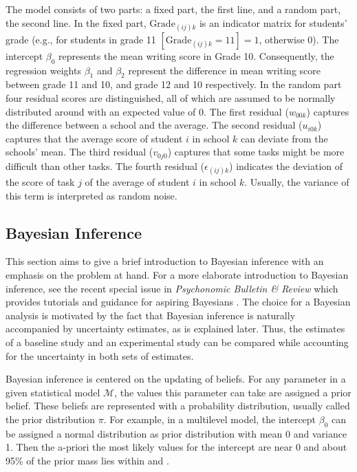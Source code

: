 \documentclass[a4paper]{article}
\newcommand{\model}{\mathcal{M}}
\begin{document}
The model consists of two parts: a fixed part, the first line, and a random part, the second line. In the fixed part, $\mathrm{Grade}_{(ij)k}$ is an indicator matrix for students' grade (e.g., for students in grade 11 $[\mathrm{Grade}_{(ij)k}=11] = 1$, otherwise 0). The intercept $\beta_0$ represents the mean writing score in Grade 10. Consequently, the regression weights $\beta_1$ and $\beta_2$ represent the difference in mean writing score between grade 11 and 10, and grade 12 and 10 respectively. In the random part four residual scores are distinguished, all of which are assumed to be normally distributed around with an expected value of 0. The first residual ($w_{00k}$) captures the difference between a school and the average. The second residual ($u_{i0k}$) captures that the average score of student $i$ in school $k$ can deviate from the schools' mean. The third residual ($v_{0j0}$) captures that some tasks might be more difficult than other tasks. The fourth residual ($\epsilon_{(ij)k}$) indicates the deviation of the score of task $j$ of the average of student $i$ in school $k$. Usually, the variance of this term is interpreted as random noise.


\subsection*{Bayesian Inference}

This section aims to give a brief introduction to Bayesian inference with an emphasis on the problem at hand. For a more elaborate introduction to Bayesian inference, see the recent special issue in \emph{Psychonomic Bulletin \& Review} which provides tutorials and guidance for aspiring Bayesians \cite{VandekerckhoveEtAl2018SI}. The choice for a Bayesian analysis is motivated by the fact that Bayesian inference is naturally accompanied by uncertainty estimates, as is explained later. Thus, the estimates of a baseline study and an experimental study can be compared while accounting for the uncertainty in both sets of estimates.

Bayesian inference is centered on the updating of beliefs. For any parameter in a given statistical model $\model$, the values this parameter can take are assigned a prior belief. These beliefs are represented with a probability distribution, usually called the prior distribution $\pi$. For example, in a multilevel model, the intercept $\beta_0$ can be assigned a normal distribution as prior distribution with mean 0 and variance 1. Then the a-priori the most likely values for the intercept are near 0 and about 95\% of the prior mass lies within \pgfmathprintnumber{-\zCrit} and \pgfmathprintnumber{\zCrit}.
\end{document}
